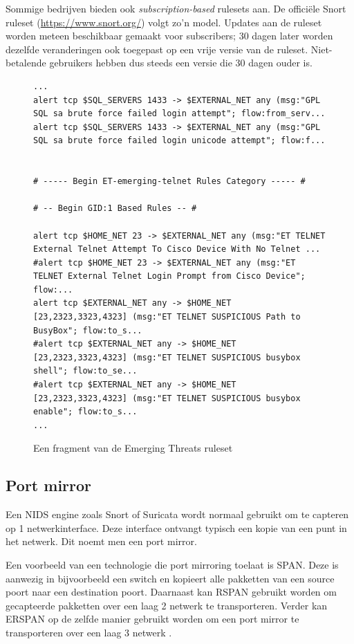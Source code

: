 \documentclass[a4paper, 12pt]{report}
\begin{document}
Sommige bedrijven bieden ook \emph{subscription-based} rulesets aan.
De officiële Snort ruleset (\url{https://www.snort.org/}) volgt zo'n model.
Updates aan de ruleset worden meteen beschikbaar gemaakt voor subscribers; 30 dagen later worden dezelfde veranderingen ook toegepast op een vrije versie van de ruleset.
Niet-betalende gebruikers hebben dus steeds een versie die 30 dagen ouder is.

\begin{figure}[H]
  \begin{lstlisting}[basicstyle=\ttfamily\scriptsize]
...
alert tcp $SQL_SERVERS 1433 -> $EXTERNAL_NET any (msg:"GPL SQL sa brute force failed login attempt"; flow:from_serv...
alert tcp $SQL_SERVERS 1433 -> $EXTERNAL_NET any (msg:"GPL SQL sa brute force failed login unicode attempt"; flow:f...


# ----- Begin ET-emerging-telnet Rules Category ----- #

# -- Begin GID:1 Based Rules -- #

alert tcp $HOME_NET 23 -> $EXTERNAL_NET any (msg:"ET TELNET External Telnet Attempt To Cisco Device With No Telnet ...
#alert tcp $HOME_NET 23 -> $EXTERNAL_NET any (msg:"ET TELNET External Telnet Login Prompt from Cisco Device"; flow:...
alert tcp $EXTERNAL_NET any -> $HOME_NET [23,2323,3323,4323] (msg:"ET TELNET SUSPICIOUS Path to BusyBox"; flow:to_s...
#alert tcp $EXTERNAL_NET any -> $HOME_NET [23,2323,3323,4323] (msg:"ET TELNET SUSPICIOUS busybox shell"; flow:to_se...
#alert tcp $EXTERNAL_NET any -> $HOME_NET [23,2323,3323,4323] (msg:"ET TELNET SUSPICIOUS busybox enable"; flow:to_s...
...
  \end{lstlisting}
  \caption{Een fragment van de Emerging Threats ruleset}
  \label{fig:et-voorbeeld}
\end{figure}

\subsection{Port mirror}
Een NIDS engine zoals Snort of Suricata wordt normaal gebruikt om te capteren op 1 netwerkinterface.
Deze interface ontvangt typisch een kopie van een punt in het netwerk.
Dit noemt men een port mirror.

Een voorbeeld van een technologie die port mirroring toelaat is SPAN.
Deze is aanwezig in bijvoorbeeld een switch en kopieert alle pakketten van een source poort naar een destination poort.
Daarnaast kan RSPAN gebruikt worden om gecapteerde pakketten over een laag 2 netwerk te transporteren.
Verder kan ERSPAN op de zelfde manier gebruikt worden om een port mirror te transporteren over een laag 3 netwerk \autocite{cisco:span}.
\end{document}
